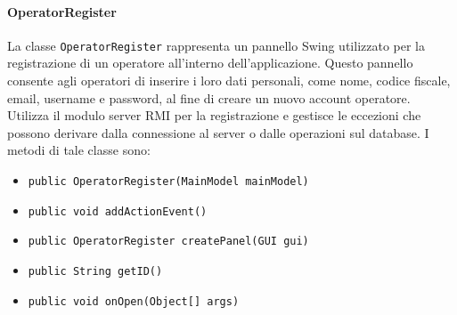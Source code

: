 \paragraph{OperatorRegister}
La classe \texttt{OperatorRegister} rappresenta un pannello Swing utilizzato per la registrazione di un operatore all'interno dell'applicazione.
Questo pannello consente agli operatori di inserire i loro dati personali, come nome, codice fiscale, email, username e password, al fine di creare un nuovo account operatore.
Utilizza il modulo server RMI per la registrazione e gestisce le eccezioni che possono derivare dalla connessione al server o dalle operazioni sul database.
I metodi di tale classe sono:
\begin{itemize}
    \item \texttt{public OperatorRegister(MainModel mainModel)}
    \item \texttt{public void addActionEvent()}
    \item \texttt{public OperatorRegister createPanel(GUI gui)}
    \item \texttt{public String getID()}
    \item \texttt{public void onOpen(Object[] args)}
\end{itemize}